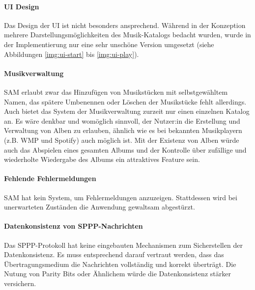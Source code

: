 \paragraph{\ac{UI} Design}
Das Design der \ac{UI} ist nicht besonders ansprechend.
Während in der Konzeption mehrere Darstellungsmöglichkeiten des Musik-Katalogs bedacht wurden, wurde in der Implementierung nur eine sehr unschöne Version umgesetzt (siehe Abbildungen \ref{img:ui-start} bis \ref{img:ui-play}).

\paragraph{Musikverwaltung}
\ac{SAM} erlaubt zwar das Hinzufügen von Musikstücken mit selbstgewähltem Namen, das spätere Umbenennen oder Löschen der Musikstücke fehlt allerdings.
Auch bietet das System der Musikverwaltung zurzeit nur einen einzelnen Katalog an.
Es wäre denkbar und womöglich sinnvoll, der Nutzer:in die Erstellung und Verwaltung von Alben zu erlauben, ähnlich wie es bei bekannten Musikplayern (z.B. \ac{WMP} und Spotify) auch möglich ist.
Mit der Existenz von Alben würde auch das Abspielen eines gesamten Albums und der Kontrolle über zufällige und wiederholte Wiedergabe des Albums ein attraktives Feature sein.

\paragraph{Fehlende Fehlermeldungen}
\ac{SAM} hat kein System, um Fehlermeldungen anzuzeigen.
Stattdessen wird bei unerwarteten Zuständen die Anwendung gewaltsam abgestürzt.

\paragraph{Datenkonsistenz von \ac{SPPP}-Nachrichten}
Das \ac{SPPP}-Protokoll hat keine eingebauten Mechanismen zum Sicherstellen der Datenkonsistenz.
Es muss entsprechend darauf vertraut werden, dass das Übertragungsmedium die Nachrichten vollständig und korrekt überträgt.
Die Nutung von Parity Bits oder Ähnlichem würde die Datenkonsistenz stärker versichern.

